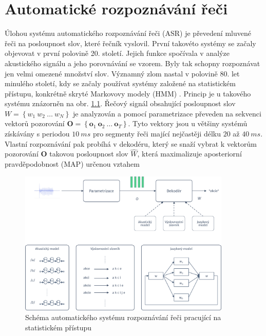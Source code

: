 \chapter{Automatické rozpoznávání řeči}
\label{chap:asr}

Úlohou systému automatického rozpoznávání řeči (ASR) je převedení mluvené řeči na posloupnost slov, které řečník vyslovil. První takovéto systémy se začaly objevovat v první polovině 20. století. Jejich funkce spočívala v analýze akustického signálu a jeho porovnávání se vzorem. Byly tak schopny rozpoznávat jen velmi omezené množství slov. Významný zlom nastal v polovině 80. let minulého století, kdy se začaly používat systémy založené na statistickém přístupu, konkrétně skryté Markovovy modely (HMM) \cite{Holmes2001}. Princip je u takového systému znázorněn na obr. \ref{fig:asr:decoding}. Řečový signál obsahující posloupnost slov $W = \left\{ w_1\ w_2\ \dots\ w_N \right\}$ je analyzován a pomocí parametrizace převeden na sekvenci vektorů pozorování $\boldsymbol{O} = \left\{\boldsymbol{o}_1\ \boldsymbol{o}_2\ \dots\ \boldsymbol{o}_T\right\}$. Tyto vektory jsou u většiny systémů získávány s periodou $10\ ms$ pro segmenty řeči mající nejčastěji délku $20$ až $40\ ms$. Vlastní rozpoznávání pak probíhá v dekodéru, který se snaží vybrat k vektorům pozorování $\boldsymbol{O}$ takovou posloupnost slov $\hat{W}$, která maximalizuje aposteriorní pravděpodobnost (MAP) určenou vztahem

\begin{figure}[hbpt]
  \centering
  \includegraphics[width=0.9\textwidth]{./ch4-asr/img/decoding.pdf}
  \caption{Schéma automatického systému rozpoznávání řeči pracující na statistickém přístupu}
  \label{fig:asr:decoding}
\end{figure}


